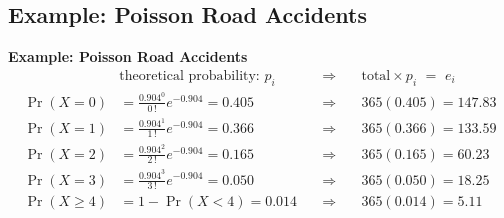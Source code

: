 \documentclass[compress]{beamer}        %
\makeatletter
\newcommand{\tcb}{\textcolor{beamer@blendedblue}}
\makeatother
\begin{document}
\subsection{Example: Poisson Road Accidents}
\begin{frame}{\bf \tcb{Example: Poisson Road Accidents\\[-1.3cm]}}
\begin{align*}
& \text{theoretical probability: } p_i  & \Rightarrow & \quad \text{total}\times p_i \,\,= \,\,e_i\\[0.2cm]
\Pr(X=0) &= \frac{0.904^0}{0\,!}e^{-0.904} = 0.405 \quad &\Rightarrow&  \quad 365(0.405) = 147.83  \\[0.5cm]
\Pr(X=1) &= \frac{0.904^1}{1\,!}e^{-0.904} = 0.366 \quad &\Rightarrow&  \quad 365(0.366) = 133.59  \\[0.5cm]
\Pr(X=2) &= \frac{0.904^2}{2\,!}e^{-0.904} = 0.165 \quad &\Rightarrow&  \quad 365(0.165) =  60.23 \\[0.5cm]
\Pr(X=3) &= \frac{0.904^3}{3\,!}e^{-0.904} = 0.050 \quad &\Rightarrow&  \quad 365(0.050) =  18.25\\[0.5cm]
\Pr(X \ge 4) &= 1 - \Pr(X < 4) = 0.014 \quad &\Rightarrow&  \quad 365(0.014) =   5.11
\end{align*}




\end{frame}
\end{document}
